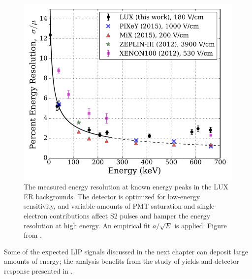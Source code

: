\begin{figure}[htbp]
\begin{center}
\includegraphics[width=\textwidth]{figures/lux/energy_resolution.png}
\caption{The measured energy resolution at known energy peaks in the LUX ER backgrounds. The detector is optimized for low-energy sensitivity, and variable amounts of PMT saturation and single-electron contributions affect S2 pulses and hamper the energy resolution at high energy. An empirical fit $a / \sqrt{E} $ is applied. Figure from \cite{LUX:YieldsAndRecombination}.}
\label{fig:energy_resolution}
\end{center}
\end{figure}

Some of the expected \ac{LIP} signals discussed in the next chapter can deposit large amounts of energy; the analysis benefits from the study of yields and detector response presented in \cite{LUX:YieldsAndRecombination}.



